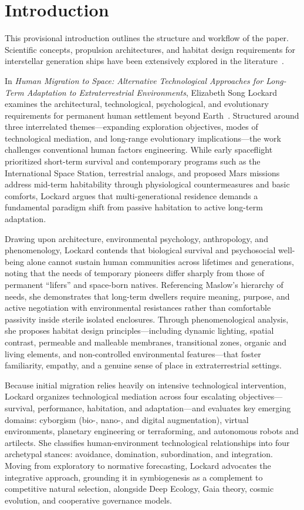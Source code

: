 \section{Introduction}
\label{sec:introduction}

This provisional introduction outlines the structure and workflow of the paper.
Scientific concepts, propulsion architectures, and habitat design requirements
for interstellar generation ships have been extensively explored in the
literature~\cite{hein2012world,smith2014star}.

In \textit{Human Migration to Space: Alternative Technological Approaches for Long-Term Adaptation to Extraterrestrial Environments}, Elizabeth Song Lockard examines the architectural, technological, psychological, and evolutionary requirements for permanent human settlement beyond Earth~\cite{lockard2014human}. Structured around three interrelated themes---expanding exploration objectives, modes of technological mediation, and long-range evolutionary implications---the work challenges conventional human factors engineering. While early spaceflight prioritized short-term survival and contemporary programs such as the International Space Station, terrestrial analogs, and proposed Mars missions address mid-term habitability through physiological countermeasures and basic comforts, Lockard argues that multi-generational residence demands a fundamental paradigm shift from passive habitation to active long-term adaptation.

Drawing upon architecture, environmental psychology, anthropology, and phenomenology, Lockard contends that biological survival and psychosocial well-being alone cannot sustain human communities across lifetimes and generations, noting that the needs of temporary pioneers differ sharply from those of permanent ``lifers'' and space-born natives. Referencing Maslow's hierarchy of needs, she demonstrates that long-term dwellers require meaning, purpose, and active negotiation with environmental resistances rather than comfortable passivity inside sterile isolated enclosures. Through phenomenological analysis, she proposes habitat design principles---including dynamic lighting, spatial contrast, permeable and malleable membranes, transitional zones, organic and living elements, and non-controlled environmental features---that foster familiarity, empathy, and a genuine sense of place in extraterrestrial settings.

Because initial migration relies heavily on intensive technological intervention, Lockard organizes technological mediation across four escalating objectives---survival, performance, habitation, and adaptation---and evaluates key emerging domains: cyborgism (bio-, nano-, and digital augmentation), virtual environments, planetary engineering or terraforming, and autonomous robots and artilects. She classifies human-environment technological relationships into four archetypal stances: avoidance, domination, subordination, and integration. Moving from exploratory to normative forecasting, Lockard advocates the integrative approach, grounding it in symbiogenesis as a complement to competitive natural selection, alongside Deep Ecology, Gaia theory, cosmic evolution, and cooperative governance models.

